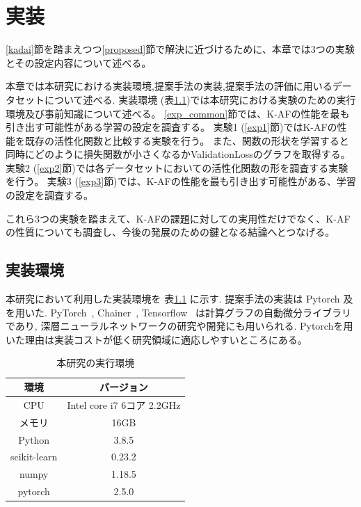 \chapter{実装}
\label{implementation}

\ref{kadai}節を踏まえつつ\ref{proposed}節で解決に近づけるために、本章では3つの実験とその設定内容について述べる。

本章では本研究における実装環境,提案手法の実装,提案手法の評価に用いるデータセットについて述べる.
実装環境 (表\ref{impl_env})では本研究における実験のための実行環境及び事前知識について述べる。
\ref{exp_common}節では、K-AFの性能を最も引き出す可能性がある学習の設定を調査する。
実験1 (\ref{exp1}節)ではK-AFの性能を既存の活性化関数と比較する実験を行う。
また、関数の形状を学習すると同時にどのように損失関数が小さくなるかValidationLossのグラフを取得する。
実験2 (\ref{exp2}節)では各データセットにおいての活性化関数の形を調査する実験を行う。
実験3 (\ref{exp3}節)では、K-AFの性能を最も引き出す可能性がある、学習の設定を調査する。

これら3つの実験を踏まえて、K-AFの課題に対しての実用性だけでなく、K-AFの性質についても調査し、今後の発展のための鍵となる結論へとつなげる。



\section{実装環境}
\label{impl_env}



本研究において利用した実装環境を 表\ref{impl_table} に示す. 提案手法の実装は Pytorch 及
を用いた.  PyTorch~\cite{pytorch}, Chainer~\cite{chainer},  Tensorflow~\cite{tensorflow} は計算グラフの自動微分ライブラリであり, 深層ニューラルネットワークの研究や開発にも用いられる.
Pytorchを用いた理由は実装コストが低く研究領域に適応しやすいところにある。


\begin{table}[htbp]
    \begin{center}
        \caption{本研究の実行環境}
        \label{impl_table}
        \vspace{2mm} 
        \begin{tabular}{|c|c|}
        \hline
        環境              & バージョン \\
        \hline
        CPU               & Intel core i7 6コア 2.2GHz \\
        \hline
        メモリ             & 16GB \\
        \hline
        Python            & 3.8.5  \\
        \hline
        scikit-learn      & 0.23.2\\
        \hline
        numpy             & 1.18.5 \\
        \hline
        pytorch           & 2.5.0 \\
        \hline
        \end{tabular}
    \end{center}
\end{table}



